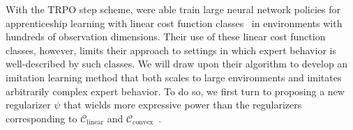 \documentclass{article}
\newcommand{\1}{\mathbb{I}} %
\begin{document}
With the TRPO step scheme, \citeauthor{ho2016model} were able train large neural network policies for apprenticeship learning with linear cost function classes~ in environments with hundreds of observation dimensions. Their use of these linear cost function classes, however, limits their approach to settings in which expert behavior is well-described by such classes.
We will draw upon their algorithm to develop an imitation learning method that both scales to large environments and imitates arbitrarily complex expert behavior.
To do so, we first turn to proposing a new regularizer $\psi$ that wields more expressive power than the regularizers corresponding to $\mathcal{C}_\text{linear}$ and $\mathcal{C}_\text{convex}$~.

%
\end{document}
